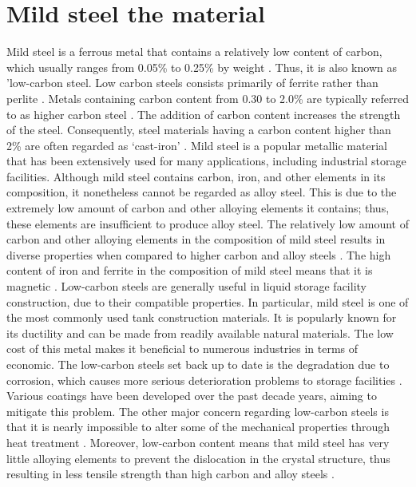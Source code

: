 \section{Mild steel the material}
Mild steel is a ferrous metal that contains a relatively low content of carbon, which usually ranges from 0.05\% to 0.25\% by weight \cite{callister2018materials}. Thus, it is also known as 'low-carbon steel.  Low carbon steels consists primarily of ferrite rather than perlite \cite{li2018effect}. Metals containing carbon content from 0.30 to 2.0\% are typically referred to as higher carbon steel \cite{timings2008fabrication}. The addition of carbon content increases the strength of the steel. Consequently, steel materials having a carbon content higher than 2\% are often regarded as ‘cast-iron' \cite{callister2018materials}.  Mild steel is a popular metallic material that has been extensively used for many applications, including industrial storage facilities.
Although mild steel contains carbon, iron, and other elements in its composition, it nonetheless cannot be regarded as alloy steel. This is due to the extremely low amount of carbon and other alloying elements it contains; thus, these elements are insufficient to produce alloy steel. The relatively low amount of carbon and other alloying elements in the composition of mild steel results in diverse properties when compared to higher carbon and alloy steels \cite{timings2008fabrication}. The high content of iron and ferrite in the composition of mild steel means that it is magnetic \cite{li2018effect}.
Low-carbon steels are generally useful in liquid storage facility construction, due to their compatible properties. In particular, mild steel is one of the most commonly used tank construction materials. It is popularly known for its ductility and can be made from readily available natural materials. The low cost of this metal makes it beneficial to numerous industries in terms of economic.
The low-carbon steels set back up to date is the degradation due to corrosion, which causes more serious deterioration problems to storage facilities \cite{erami2019carboxamide}. Various coatings have been developed over the past decade years, aiming to mitigate this problem. The other major concern regarding low-carbon steels is that it is nearly impossible to alter some of the mechanical properties through heat treatment \cite{callister2018materials}. Moreover, low-carbon content means that mild steel has very little alloying elements to prevent the dislocation in the crystal structure, thus resulting in less tensile strength than high carbon and alloy steels \cite{callister2018materials}.
